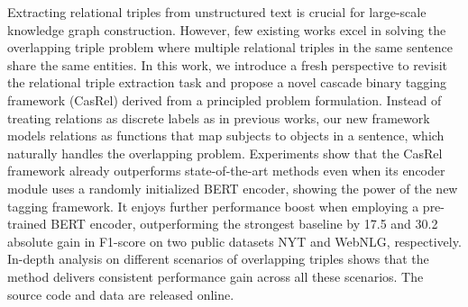 Extracting relational triples from unstructured text is crucial for large-scale knowledge graph construction. However, few existing works excel in solving the overlapping triple problem where multiple relational triples in the same sentence share the same entities. In this work, we introduce a fresh perspective to revisit the relational triple extraction task and propose a novel cascade binary tagging framework (CasRel) derived from a principled problem formulation. Instead of treating relations as discrete labels as in previous works, our new framework models relations as functions that map subjects to objects in a sentence, which naturally handles the overlapping problem. Experiments show that the CasRel framework already outperforms state-of-the-art methods even when its encoder module uses a randomly initialized BERT encoder, showing the power of the new tagging framework. It enjoys further performance boost when employing a pre-trained BERT encoder, outperforming the strongest baseline by 17.5 and 30.2 absolute gain in F1-score on two public datasets NYT and WebNLG, respectively. In-depth analysis on different scenarios of overlapping triples shows that the method delivers consistent performance gain across all these scenarios. The source code and data are released online.
